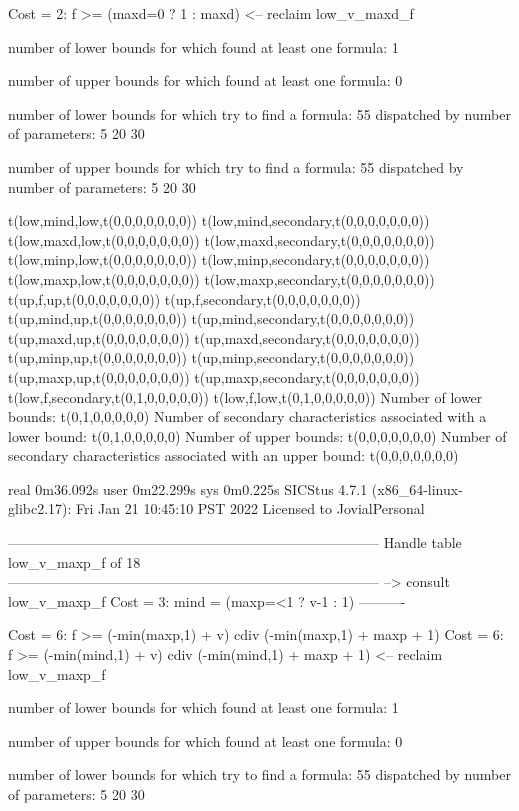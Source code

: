 Cost =  2:  f >= (maxd=0 ? 1 : maxd)
<-- reclaim low_v_maxd_f

number of lower bounds for which found at least one formula: 1

number of upper bounds for which found at least one formula: 0

number of lower bounds for which try to find a formula: 55
dispatched by number of parameters: 5  20  30

number of upper bounds for which try to find a formula: 55
dispatched by number of parameters: 5  20  30

t(low,mind,low,t(0,0,0,0,0,0,0))
t(low,mind,secondary,t(0,0,0,0,0,0,0))
t(low,maxd,low,t(0,0,0,0,0,0,0))
t(low,maxd,secondary,t(0,0,0,0,0,0,0))
t(low,minp,low,t(0,0,0,0,0,0,0))
t(low,minp,secondary,t(0,0,0,0,0,0,0))
t(low,maxp,low,t(0,0,0,0,0,0,0))
t(low,maxp,secondary,t(0,0,0,0,0,0,0))
t(up,f,up,t(0,0,0,0,0,0,0))
t(up,f,secondary,t(0,0,0,0,0,0,0))
t(up,mind,up,t(0,0,0,0,0,0,0))
t(up,mind,secondary,t(0,0,0,0,0,0,0))
t(up,maxd,up,t(0,0,0,0,0,0,0))
t(up,maxd,secondary,t(0,0,0,0,0,0,0))
t(up,minp,up,t(0,0,0,0,0,0,0))
t(up,minp,secondary,t(0,0,0,0,0,0,0))
t(up,maxp,up,t(0,0,0,0,0,0,0))
t(up,maxp,secondary,t(0,0,0,0,0,0,0))
t(low,f,secondary,t(0,1,0,0,0,0,0))
t(low,f,low,t(0,1,0,0,0,0,0))
Number of lower bounds:                                             t(0,1,0,0,0,0,0)
Number of secondary characteristics associated with a lower bound:  t(0,1,0,0,0,0,0)
Number of upper bounds:                                             t(0,0,0,0,0,0,0)
Number of secondary characteristics associated with an upper bound: t(0,0,0,0,0,0,0)

real	0m36.092s
user	0m22.299s
sys	0m0.225s
SICStus 4.7.1 (x86_64-linux-glibc2.17): Fri Jan 21 10:45:10 PST 2022
Licensed to JovialPersonal


--------------------------------------------------------------------------------
Handle table low_v_maxp_f of 18
--------------------------------------------------------------------------------
--> consult low_v_maxp_f
Cost =  3:  mind = (maxp=<1 ? v-1 : 1)
----------

Cost =  6:  f >= (-min(maxp,1) + v) cdiv (-min(maxp,1) + maxp + 1)
Cost =  6:  f >= (-min(mind,1) + v) cdiv (-min(mind,1) + maxp + 1)
<-- reclaim low_v_maxp_f

number of lower bounds for which found at least one formula: 1

number of upper bounds for which found at least one formula: 0

number of lower bounds for which try to find a formula: 55
dispatched by number of parameters: 5  20  30

